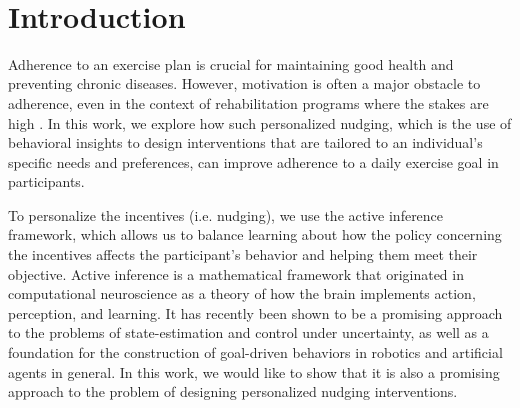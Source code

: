 \documentclass[manuscript,screen,review]{acmart}
\begin{document}
\keywords{}　%

\begin{teaserfigure}
  \caption{}
  \Description{}
  \label{fig:teaser}
\end{teaserfigure}


\maketitle

\section{Introduction}

Adherence to an exercise plan is crucial for maintaining good health and preventing chronic diseases. However,
motivation is often a major obstacle to adherence, even in the context of rehabilitation programs where the stakes
are high \cite{daly2002barriers}. In this work, we explore how such personalized nudging, which is the use of behavioral insights to design interventions that are tailored to an individual’s specific needs and preferences, can improve adherence to a daily exercise goal in participants.

To personalize the incentives (i.e. nudging), we use the active inference framework, which allows us to
balance
learning about how the policy concerning the incentives affects the participant’s behavior and helping them meet
their objective. Active inference is a mathematical framework that originated in computational neuroscience as a
theory of how the brain implements action, perception, and learning. It has recently been shown to be a promising
approach to the problems of state-estimation and control under uncertainty, as well as a foundation for the
construction of goal-driven behaviors in robotics and artificial agents in general. In this work, we would like to
show that it is also a promising approach to the problem of designing personalized nudging interventions.
\end{document}
